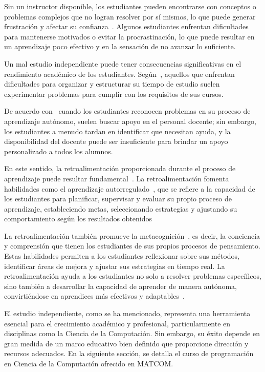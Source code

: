 \documentclass{article}
\begin{document}
Sin un instructor disponible, los estudiantes pueden encontrarse con conceptos o problemas complejos que no logran resolver por sí mismos, lo que puede generar frustración y afectar su confianza~\cite{overklift2019}. Algunos estudiantes enfrentan dificultades para mantenerse motivados o evitar la procrastinación, lo que puede resultar en un aprendizaje poco efectivo y en la sensación de no avanzar lo suficiente\cite{coto02012022}. 

Un mal estudio independiente puede tener consecuencias significativas en el rendimiento académico de los estudiantes. Según~\cite{overklift2019}, aquellos que enfrentan dificultades para organizar y estructurar su tiempo de estudio suelen experimentar problemas para cumplir con los requisitos de sus cursos.

De acuerdo con~\cite{overklift2019} cuando los estudiantes reconocen problemas en su proceso de aprendizaje autónomo, suelen buscar apoyo en el personal docente; sin embargo, los estudiantes a menudo tardan en identificar que necesitan ayuda, y la disponibilidad del docente puede ser insuficiente para brindar un apoyo personalizado a todos los alumnos.

En este sentido, la retroalimentación proporcionada durante el proceso de aprendizaje puede resultar fundamental~\cite{Sarsa_2022}. La retroalimentación fomenta habilidades como el aprendizaje autorregulado~\cite{Sarsa_2022}, que se refiere a la capacidad de los estudiantes para planificar, supervisar y evaluar su propio proceso de aprendizaje, estableciendo metas, seleccionando estrategias y ajustando su comportamiento según los resultados obtenidos

La retroalimentación también promueve la metacognición~\cite{Sarsa_2022}, es decir, la conciencia y comprensión que tienen los estudiantes de sus propios procesos de pensamiento. Estas habilidades permiten a los estudiantes reflexionar sobre sus métodos, identificar áreas de mejora y ajustar sus estrategias en tiempo real. La retroalimentación ayuda a los estudiantes no solo a resolver problemas específicos, sino también a desarrollar la capacidad de aprender de manera autónoma, convirtiéndose en aprendices más efectivos y adaptables~\cite{shute2008focus}.

El estudio independiente, como se ha mencionado, representa una herramienta esencial para el crecimiento académico y profesional, particularmente en disciplinas como la Ciencia de la Computación. Sin embargo, su éxito depende en gran medida de un marco educativo bien definido que proporcione dirección y recursos adecuados. En la siguiente sección, se detalla el curso de programación en Ciencia de la Computación ofrecido en \mbox{MATCOM}.
\end{document}
